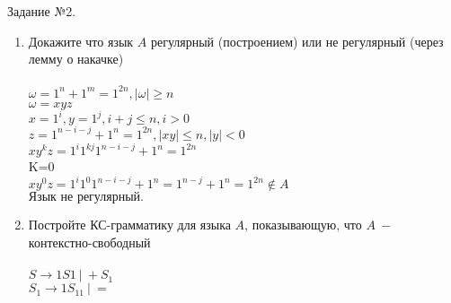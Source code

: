 \documentclass{article}
\begin{document}
    \huge{\centerline{Задание №2.}}
        \begin{enumerate}
        
        \LARGE
		\item Докажите что язык \(A\) регулярный (построением) или не регулярный (через лемму о накачке)\\\\
		 
		 \(\omega = 1^n + 1^m = 1^{2n}, |\omega|\geq n\)\\
		 \(\omega = xyz\)\\
		 \(x = 1^i, y=1^j, i+j\leq n, i>0\)\\
		 \(z = 1^{n-i-j} + 1^n = 1^{2n}, |xy|\leq n, |y|<0\)\\
		 \(xy^kz=1^i1^{kj}1^{n-i-j}+1^n= 1^{2n}\)\\
		 K=0\\
		 \(xy^0z=1^i1^{0}1^{n-i-j}+1^n=1^{n-j}+1^n =1^{2n} \notin A\)\\ 
		 \(\text{Язык не регулярный.}\)\\
		 
		\item Постройте КС-грамматику для языка \(A\), показывающую, что \(A\ -\) контекстно-свободный\\\\
		
		\hspace*{-20mm}\(S\rightarrow 1S1\ | \ +S_1 \)\\
		\hspace*{-20mm}\(S_1\rightarrow 1S_11 \ | \ = \)\\\\
	
        \end{enumerate}
        
\end{document}
